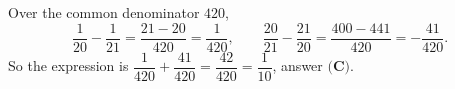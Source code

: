 Over the common denominator $420$,
\[\dfrac{1}{20}-\dfrac{1}{21}=\dfrac{21-20}{420}=\dfrac{1}{420},\qquad\dfrac{20}{21}-\dfrac{21}{20}=\dfrac{400-441}{420}=-\dfrac{41}{420}.\]
So the expression is $\dfrac{1}{420}+\dfrac{41}{420}=\dfrac{42}{420}=\boxed{\dfrac{1}{10}}$, answer $\textbf{(C)}$.
